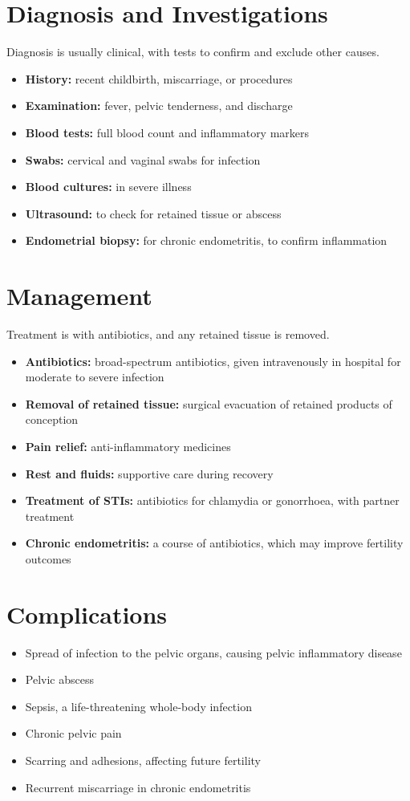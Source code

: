 \section*{Diagnosis and Investigations}
Diagnosis is usually clinical, with tests to confirm and exclude other causes.
\begin{itemize}
    \item \textbf{History:} recent childbirth, miscarriage, or procedures
    \item \textbf{Examination:} fever, pelvic tenderness, and discharge
    \item \textbf{Blood tests:} full blood count and inflammatory markers
    \item \textbf{Swabs:} cervical and vaginal swabs for infection
    \item \textbf{Blood cultures:} in severe illness
    \item \textbf{Ultrasound:} to check for retained tissue or abscess
    \item \textbf{Endometrial biopsy:} for chronic endometritis, to confirm inflammation
\end{itemize}

\section*{Management}
Treatment is with antibiotics, and any retained tissue is removed.
\begin{itemize}
    \item \textbf{Antibiotics:} broad-spectrum antibiotics, given intravenously in hospital for moderate to severe infection
    \item \textbf{Removal of retained tissue:} surgical evacuation of retained products of conception
    \item \textbf{Pain relief:} anti-inflammatory medicines
    \item \textbf{Rest and fluids:} supportive care during recovery
    \item \textbf{Treatment of STIs:} antibiotics for chlamydia or gonorrhoea, with partner treatment
    \item \textbf{Chronic endometritis:} a course of antibiotics, which may improve fertility outcomes
\end{itemize}

\section*{Complications}
\begin{itemize}
    \item Spread of infection to the pelvic organs, causing pelvic inflammatory disease
    \item Pelvic abscess
    \item Sepsis, a life-threatening whole-body infection
    \item Chronic pelvic pain
    \item Scarring and adhesions, affecting future fertility
    \item Recurrent miscarriage in chronic endometritis
\end{itemize}

